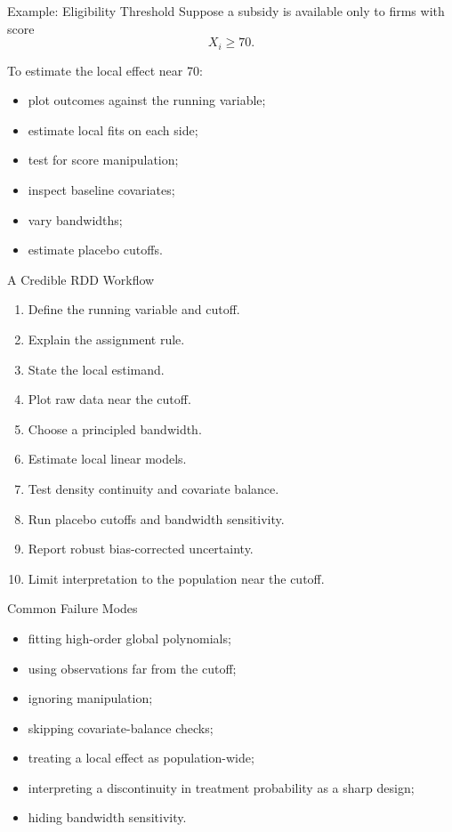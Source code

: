 \documentclass[aspectratio=169,11pt]{beamer}
\begin{document}
\begin{frame}{Example: Eligibility Threshold}
Suppose a subsidy is available only to firms with score
\[
X_i\ge 70.
\]

To estimate the local effect near 70:
\begin{itemize}
\item plot outcomes against the running variable;
\item estimate local fits on each side;
\item test for score manipulation;
\item inspect baseline covariates;
\item vary bandwidths;
\item estimate placebo cutoffs.
\end{itemize}
\end{frame}

\begin{frame}{A Credible RDD Workflow}
\begin{enumerate}
\item Define the running variable and cutoff.
\item Explain the assignment rule.
\item State the local estimand.
\item Plot raw data near the cutoff.
\item Choose a principled bandwidth.
\item Estimate local linear models.
\item Test density continuity and covariate balance.
\item Run placebo cutoffs and bandwidth sensitivity.
\item Report robust bias-corrected uncertainty.
\item Limit interpretation to the population near the cutoff.
\end{enumerate}
\end{frame}

\begin{frame}{Common Failure Modes}
\begin{itemize}
\item fitting high-order global polynomials;
\item using observations far from the cutoff;
\item ignoring manipulation;
\item skipping covariate-balance checks;
\item treating a local effect as population-wide;
\item interpreting a discontinuity in treatment probability as a sharp design;
\item hiding bandwidth sensitivity.
\end{itemize}
\end{frame}
\end{document}
